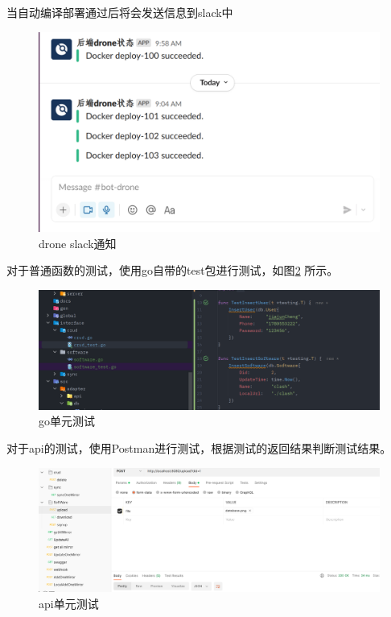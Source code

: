 \documentclass[supercite]{Experimental_Report}
\theoremstyle{definition}
\begin{document}
当自动编译部署通过后将会发送信息到slack中
\begin{figure}[!h]
    \centering
    \includegraphics[width=1\textwidth]{./images/drone-bot.png}
    \caption{drone slack通知}
    \label{slack}
\end{figure}

对于普通函数的测试，使用go自带的test包进行测试，如图\ref{go-test} 所示。
\begin{figure}[!h]
    \centering
    \includegraphics[width=1\textwidth]{./images/test.png}
    \caption{go单元测试}
    \label{go-test}
\end{figure}

对于api的测试，使用Postman进行测试，根据测试的返回结果判断测试结果。
\newpage
\begin{figure}[!h]
    \centering
    \includegraphics[width=1\textwidth]{./images/api_test.png}
    \caption{api单元测试}
    \label{api-test}
\end{figure}
\end{document}
